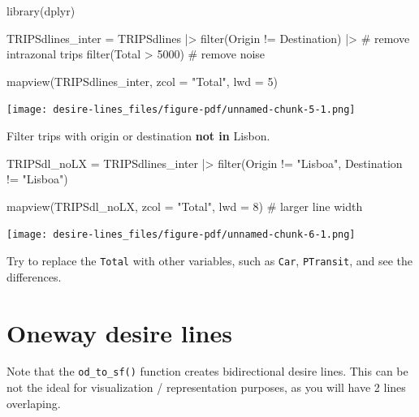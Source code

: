 \documentclass[
  letterpaper,
  DIV=11,
  numbers=noendperiod]{scrreprt}
\newenvironment{Shaded}{\begin{snugshade}}{\end{snugshade}}
\newcommand{\AttributeTok}[1]{\textcolor[rgb]{0.40,0.45,0.13}{#1}}
\newcommand{\CommentTok}[1]{\textcolor[rgb]{0.37,0.37,0.37}{#1}}
\newcommand{\DecValTok}[1]{\textcolor[rgb]{0.68,0.00,0.00}{#1}}
\newcommand{\FunctionTok}[1]{\textcolor[rgb]{0.28,0.35,0.67}{#1}}
\newcommand{\NormalTok}[1]{\textcolor[rgb]{0.00,0.23,0.31}{#1}}
\newcommand{\OtherTok}[1]{\textcolor[rgb]{0.00,0.23,0.31}{#1}}
\newcommand{\SpecialCharTok}[1]{\textcolor[rgb]{0.37,0.37,0.37}{#1}}
\newcommand{\StringTok}[1]{\textcolor[rgb]{0.13,0.47,0.30}{#1}}
\begin{document}
\begin{Shaded}
\begin{Highlighting}[]
\FunctionTok{library}\NormalTok{(dplyr)}

\NormalTok{TRIPSdlines\_inter }\OtherTok{=}\NormalTok{ TRIPSdlines }\SpecialCharTok{|\textgreater{}} 
  \FunctionTok{filter}\NormalTok{(Origin }\SpecialCharTok{!=}\NormalTok{ Destination) }\SpecialCharTok{|\textgreater{}} \CommentTok{\# remove intrazonal trips}
  \FunctionTok{filter}\NormalTok{(Total }\SpecialCharTok{\textgreater{}} \DecValTok{5000}\NormalTok{) }\CommentTok{\# remove noise}

\FunctionTok{mapview}\NormalTok{(TRIPSdlines\_inter, }\AttributeTok{zcol =} \StringTok{"Total"}\NormalTok{, }\AttributeTok{lwd =} \DecValTok{5}\NormalTok{)}
\end{Highlighting}
\end{Shaded}

\texttt{[image: desire-lines\_files/figure-pdf/unnamed-chunk-5-1.png]}

Filter trips with origin or destination \textbf{not in} Lisbon.

\begin{Shaded}
\begin{Highlighting}[]
\NormalTok{TRIPSdl\_noLX }\OtherTok{=}\NormalTok{ TRIPSdlines\_inter }\SpecialCharTok{|\textgreater{}} 
  \FunctionTok{filter}\NormalTok{(Origin }\SpecialCharTok{!=} \StringTok{"Lisboa"}\NormalTok{, Destination }\SpecialCharTok{!=} \StringTok{"Lisboa"}\NormalTok{)}

\FunctionTok{mapview}\NormalTok{(TRIPSdl\_noLX, }\AttributeTok{zcol =} \StringTok{"Total"}\NormalTok{, }\AttributeTok{lwd =} \DecValTok{8}\NormalTok{) }\CommentTok{\# larger line width}
\end{Highlighting}
\end{Shaded}

\texttt{[image: desire-lines\_files/figure-pdf/unnamed-chunk-6-1.png]}

Try to replace the \texttt{Total} with other variables, such as
\texttt{Car}, \texttt{PTransit}, and see the differences.

\section{Oneway desire lines}\label{oneway-desire-lines}

Note that the \texttt{od\_to\_sf()} function creates bidirectional
desire lines. This can be not the ideal for visualization /
representation purposes, as you will have 2 lines overlaping.
\end{document}
